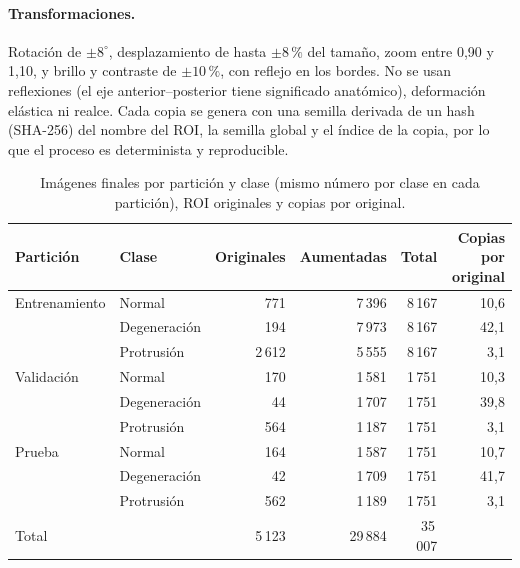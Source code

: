 \paragraph{Transformaciones.} Rotación de $\pm 8^{\circ}$, desplazamiento de hasta $\pm 8\,\%$ del tamaño, zoom entre 0,90 y 1,10, y brillo y contraste de $\pm 10\,\%$, con reflejo en los bordes. No se usan reflexiones (el eje anterior--posterior tiene significado anatómico), deformación elástica ni realce. Cada copia se genera con una semilla derivada de un hash (SHA-256) del nombre del ROI, la semilla global y el índice de la copia, por lo que el proceso es determinista y reproducible.

\begin{table}[t]
\centering\small
\caption{Imágenes finales por partición y clase (mismo número por clase en cada partición), ROI originales y copias por original.}
\label{tab:35k}
\begin{tabular}{llrrrr}
\toprule
Partición & Clase & Originales & Aumentadas & Total & Copias por original \\
\midrule
Entrenamiento & Normal       & 771    & 7\,396 & 8\,167 & 10,6 \\
              & Degeneración & 194    & 7\,973 & 8\,167 & 42,1 \\
              & Protrusión   & 2\,612 & 5\,555 & 8\,167 & 3,1  \\
Validación    & Normal       & 170    & 1\,581 & 1\,751 & 10,3 \\
              & Degeneración & 44     & 1\,707 & 1\,751 & 39,8 \\
              & Protrusión   & 564    & 1\,187 & 1\,751 & 3,1  \\
Prueba        & Normal       & 164    & 1\,587 & 1\,751 & 10,7 \\
              & Degeneración & 42     & 1\,709 & 1\,751 & 41,7 \\
              & Protrusión   & 562    & 1\,189 & 1\,751 & 3,1  \\
\midrule
Total         &              & 5\,123 & 29\,884 & 35\,007 & \\
\bottomrule
\end{tabular}
\end{table}

